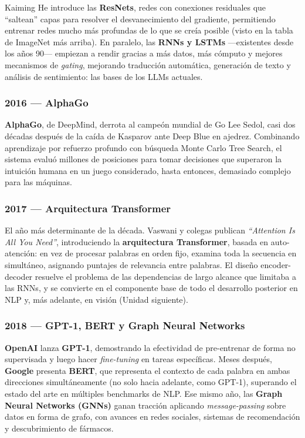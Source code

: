 \documentclass[
  letterpaper,
  DIV=11,
  numbers=noendperiod]{scrartcl}
\begin{document}
Kaiming He introduce las \textbf{ResNets}, redes con conexiones
residuales que ``saltean'' capas para resolver el desvanecimiento del
gradiente, permitiendo entrenar redes mucho más profundas de lo que se
creía posible (visto en la tabla de ImageNet más arriba). En paralelo,
las \textbf{RNNs y LSTMs} ---existentes desde los años 90--- empiezan a
rendir gracias a más datos, más cómputo y mejores mecanismos de
\emph{gating}, mejorando traducción automática, generación de texto y
análisis de sentimiento: las bases de los LLMs actuales.

\subsubsection{2016 --- AlphaGo}\label{alphago}

\textbf{AlphaGo}, de DeepMind, derrota al campeón mundial de Go Lee
Sedol, casi dos décadas después de la caída de Kasparov ante Deep Blue
en ajedrez. Combinando aprendizaje por refuerzo profundo con búsqueda
Monte Carlo Tree Search, el sistema evaluó millones de posiciones para
tomar decisiones que superaron la intuición humana en un juego
considerado, hasta entonces, demasiado complejo para las máquinas.

\subsubsection{2017 --- Arquitectura
Transformer}\label{arquitectura-transformer}

El año más determinante de la década. Vaswani y colegas publican
\emph{``Attention Is All You Need''}, introduciendo la
\textbf{arquitectura Transformer}, basada en auto-atención: en vez de
procesar palabras en orden fijo, examina toda la secuencia en
simultáneo, asignando puntajes de relevancia entre palabras. El diseño
encoder-decoder resuelve el problema de las dependencias de largo
alcance que limitaba a las RNNs, y se convierte en el componente base de
todo el desarrollo posterior en NLP y, más adelante, en visión (Unidad
siguiente).

\subsubsection{2018 --- GPT-1, BERT y Graph Neural
Networks}\label{gpt-1-bert-y-graph-neural-networks}

\textbf{OpenAI} lanza \textbf{GPT-1}, demostrando la efectividad de
pre-entrenar de forma no supervisada y luego hacer \emph{fine-tuning} en
tareas específicas. Meses después, \textbf{Google} presenta
\textbf{BERT}, que representa el contexto de cada palabra en ambas
direcciones simultáneamente (no solo hacia adelante, como GPT-1),
superando el estado del arte en múltiples benchmarks de NLP. Ese mismo
año, las \textbf{Graph Neural Networks (GNNs)} ganan tracción aplicando
\emph{message-passing} sobre datos en forma de grafo, con avances en
redes sociales, sistemas de recomendación y descubrimiento de fármacos.
\end{document}
